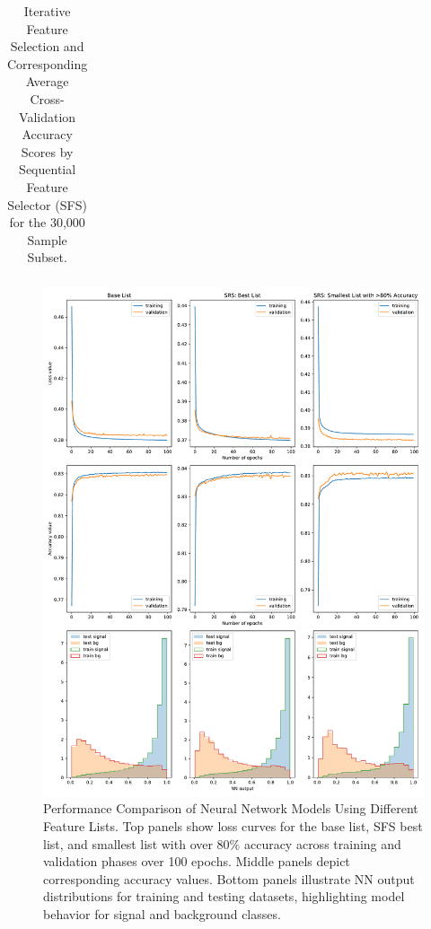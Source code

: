 \documentclass[]{article}
\begin{document}
\begin{landscape}
\begin{table}[]
{\begin{tabular}{@{}lr@{}}
	\end{tabular}
	}
	\caption{Iterative Feature Selection and Corresponding Average Cross-Validation Accuracy Scores by Sequential Feature Selector (SFS) for the 30,000 Sample Subset.}
	\label{table:SFS_results}
\end{table}

\end{landscape}

\begin{figure}[h!]
	\centering
	\includegraphics[width=\linewidth]{feature_comparison/feat-comparison.pdf}
	\caption{Performance Comparison of Neural Network Models Using Different Feature Lists. Top panels show loss curves for the base list, SFS best list, and smallest list with over $80\%$ accuracy across training and validation phases over 100 epochs. Middle panels depict corresponding accuracy values. Bottom panels illustrate NN output distributions for training and testing datasets, highlighting model behavior for signal and background classes.}
	\label{fig:base_models}
\end{figure}
\end{document}
